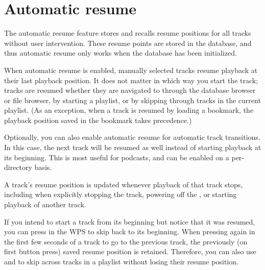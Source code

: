 \section{\label{ref:Autoresumeconfigactual}Automatic resume}

The automatic resume feature stores and recalls resume positions for
all tracks without user intervention.  These resume points are stored
in the database, and thus automatic resume only works when the
database has been initialized.

When automatic resume is enabled, manually selected tracks resume
playback at their last playback position.  It does not matter in which
way you start the track; tracks are resumed whether they are navigated
to through the database browser or file browser, by starting a
playlist, or by skipping through tracks in the current playlist.  (As
an exception, when a track is resumed by loading a bookmark, the
playback position saved in the bookmark takes precedence.)

Optionally, you can also enable automatic resume for automatic track
transitions.  In this case, the next track will be resumed as well
instead of starting playback at its beginning.  This is most useful
for podcasts, and can be enabled on a per-directory basis.

A track's resume position is updated whenever playback of that track
stops, including when explicitly stopping the track, powering off the
\dap{}, or starting playback of another track.

If you intend to start a track from its beginning but notice that it
was resumed, you can press \ActionWpsSkipPrev{} in the WPS to skip back to
its beginning.  When pressing \ActionWpsSkipPrev{} again in the first few
seconds of a track to go to the previous track, the previously (on
first button press) saved resume position is retained.  Therefore, you
can also use \ActionWpsSkipPrev{} and \ActionWpsSkipNext{} to skip
across tracks in a playlist without losing their resume position.

